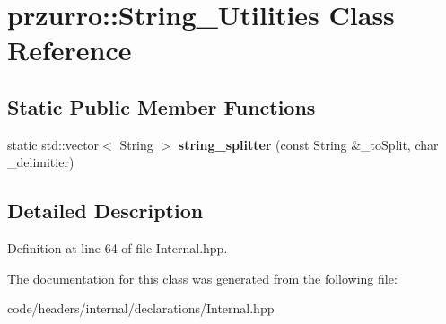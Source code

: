\hypertarget{classprzurro_1_1_string___utilities}{}\section{przurro\+::String\+\_\+\+Utilities Class Reference}
\label{classprzurro_1_1_string___utilities}
\subsection*{Static Public Member Functions}
\begin{DoxyCompactItemize}
\item 
\mbox{\label{classprzurro_1_1_string___utilities_ae81261bf812b68d95ce70a9967672c8a}} 
static std\+::vector$<$ String $>$ {\bfseries string\+\_\+splitter} (const String \&\+\_\+to\+Split, char \+\_\+delimitier)
\end{DoxyCompactItemize}


\subsection{Detailed Description}


Definition at line 64 of file Internal.\+hpp.



The documentation for this class was generated from the following file\+:\begin{DoxyCompactItemize}
\item 
code/headers/internal/declarations/Internal.\+hpp\end{DoxyCompactItemize}
